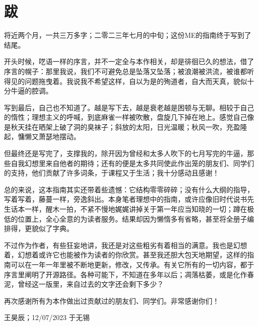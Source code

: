 \chapter{跋}
将近两个月，一共三万多字；二零二三年七月的中旬；这份ME的指南终于写到了结尾。

开头时候，呓语一样的序言，并不一定全与本作相关，却是徘徊已久的想法，借了序言的幌子：那里我说，我们不可避免总是坠落又坠落；被浪潮被洪流，被谁都听得见的问题拖曳着。我说我不希望这样，自以为是的殉道者，自大而天真，貌似十分牛逼的腔调。

写到最后，自己也不知道了。越是写下去，越是衰老越是困顿与无聊。相较于自己的惰性；理想主义的呼喊，到底麻雀一样被吹散，盘旋几下掉在地上。感觉自己像是秋天挂在晒架上破了洞的臭袜子；斜放的太阳，日光温暖；秋风一吹，充盈隆起，慵懒又萧瑟地摆动。

但最终还是写完了，支撑我的，除开因为曾经和太多人吹下的七月写完的牛逼，那些自我幻想里来自他者的期待；还有的便是太多共同使此作出笼的朋友们、同学们的支持，他们贡献了许多词条，于课程又于生活；我十分感动且感谢！

总的来说，这本指南其实还带着些遗憾：它结构零零碎碎；没有什么大纲的指导，写着写着，藤蔓一样，旁逸斜出。本身笔者理想中的指南，或许应像旧时代说书先生话本一样，醒木一拍，不紧不慢地娓娓讲掉关于第一年应当知晓的一切；蹲在极低的位置上，全心全意的为读者服务。结果却因为懒惰多有省略，甚至将全册子编排得，更貌似了字典。

不过作为作者，有些狂妄地讲，我还是对这些粗劣有着相当的满意。我也是幻想着，幻想着或许它也能被作为读者的你欣赏。甚至我还胆大包天地期望，这样的指南可以在一年一年里被不断地更新，修改，又传承。有关它所有的一切内容，都于序言里阐明了开源路径。各种可能下，不知道在多年以后；凋落枯萎，或是化作春泥，曾经这一版里，来自过去的文字还会剩下多少？

再次感谢所有为本作做出过贡献过的朋友们、同学们。非常感谢你们！

\begin{flushright}
王昊辰；12/07/2023 于无锡
\end{flushright}